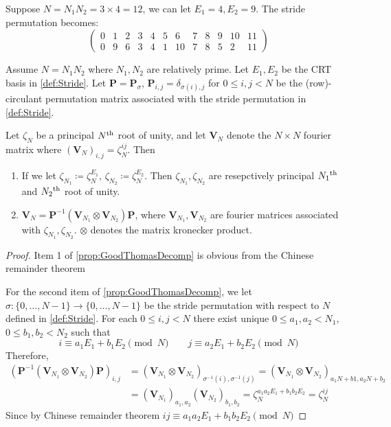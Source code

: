 \ifFullVersion
\begin{example}
    Suppose \(N = N_1 N_2 = 3 \times 4 = 12\), we can let \(E_1 = 4, E_2 = 9\). The stride permutation becomes:
    \[\begin{pmatrix}
        0 & 1 & 2 & 3 & 4 & 5 & 6 & 7 & 8 & 9 & 10 & 11\\ 
        0 & 9 & 6 & 3 & 4 & 1 & 10 & 7 & 8 & 5 & 2 & 11
    \end{pmatrix}\]
\end{example}
\fi

\begin{proposition}\label{prop:GoodThomasDecomp}
    Assume \(N = N_1 N_2\) where \(N_1, N_2\) are relatively prime. Let \(E_1, E_2\) be the CRT basis in \cref{def:Stride}. Let \(\bm{P} = \bm{P}_{\sigma}\), \(\bm{P}_{i,j} = \delta_{\sigma(i), j}\) for \(0 \le i,j < N\) be the (row)-circulant permutation matrix associated with the stride permutation in \cref{def:Stride}.
    
    Let \(\zeta_N\) be a principal \(N\textsuperscript{th}\) root of unity, and let \(\bm{V}_N\) denote the \(N \times N\) fourier matrix where \((\bm{V}_N)_{i,j} = \zeta_N^{ij}\). Then
    \begin{enumerate}
        \item If we let \(\zeta_{N_1} \coloneq \zeta_N^{E_1}\), \(\zeta_{N_2} \coloneq \zeta_N^{E_2}\). Then \(\zeta_{N_1}, \zeta_{N_2}\) are resepctively principal \(N_1\textsuperscript{th}\) and \(N_2\textsuperscript{th}\) root of unity.
        \item \(\bm{V}_N = \bm{P}^{-1} (\bm{V}_{N_1} \otimes \bm{V}_{N_2}) \bm{P}\), where \(\bm{V}_{N_1}, \bm{V}_{N_2}\) are fourier matrices associated with \(\zeta_{N_1}, \zeta_{N_2}\). \(\otimes\) denotes the matrix kronecker product.
    \end{enumerate}
\end{proposition}
\begin{proof}
    Item 1 of \cref{prop:GoodThomasDecomp} is obvious from the Chinese remainder theorem

    For the second item of \cref{prop:GoodThomasDecomp}, we let \(\sigma: \{0,\ldots,N-1\} \to \{0,\ldots,N-1\}\) be the stride permutation with respect to \(N\) defined in \cref{def:Stride}. For each \(0 \le i,j < N\) there exist unique \(0 \le a_1, a_2 < N_1\), \(0 \le b_1,b_2 < N_2\) such that
    \[i \equiv a_1 E_1 + b_1 E_2 \pmod{N} \qquad j \equiv a_2 E_1 + b_2 E_2 \pmod{N}\]
    Therefore,
    \begin{align*}
        \left(\bm{P}^{-1} (\bm{V}_{N_1} \otimes \bm{V}_{N_2}) \bm{P}\right)_{i,j} &= \left(\bm{V}_{N_1} \otimes \bm{V}_{N_2}\right)_{\sigma^{-1}(i), \sigma^{-1}(j)} = \left(\bm{V}_{N_1} \otimes \bm{V}_{N_2}\right)_{a_1 N + b1, a_2 N + b_2} \\
        &= (\bm{V}_{N_1})_{a_1, a_2} (\bm{V}_{N_2})_{b_1, b_2} = \zeta_N^{a_1 a_2 E_1 + b_1 b_2 E_2} = \zeta_N^{ij}
    \end{align*}
    Since by Chinese remainder theorem \(ij \equiv a_1 a_2 E_1 + b_1 b_2 E_2 \pmod{N}\)
\end{proof}


